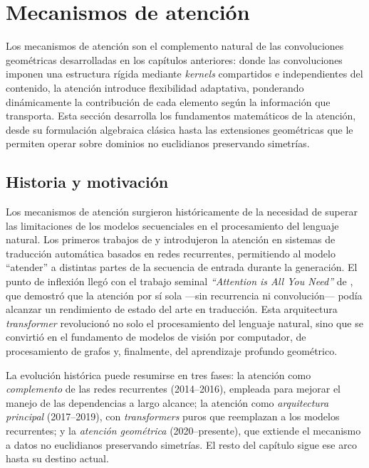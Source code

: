 \section{Mecanismos de atenci\'on}
\label{sec:apps:attention-foundations}

Los mecanismos de atenci\'on son el complemento natural de las convoluciones
geom\'etricas desarrolladas en los cap\'itulos anteriores: donde las
convoluciones imponen una estructura r\'igida mediante \emph{kernels}
compartidos e independientes del contenido, la atenci\'on introduce flexibilidad
adaptativa, ponderando din\'amicamente la contribuci\'on de cada elemento seg\'un
la informaci\'on que transporta. Esta secci\'on desarrolla los fundamentos
matem\'aticos de la atenci\'on, desde su formulaci\'on algebraica cl\'asica hasta
las extensiones geom\'etricas que le permiten operar sobre dominios no
euclidianos preservando simetr\'ias.

\subsection{Historia y motivaci\'on}
\label{subsec:apps:attn-history}

Los mecanismos de atenci\'on surgieron hist\'oricamente de la necesidad de
superar las limitaciones de los modelos secuenciales en el procesamiento del
lenguaje natural. Los primeros trabajos de \citet{bahdanau2014neural} y
\citet{luong2015effective} introdujeron la atenci\'on en sistemas de traducci\'on
autom\'atica basados en redes recurrentes, permitiendo al modelo ``atender'' a
distintas partes de la secuencia de entrada durante la generaci\'on. El punto de
inflexi\'on lleg\'o con el trabajo seminal \emph{``Attention is All You Need''}
de \citet{vaswani2017attentionneed}, que demostr\'o que la atenci\'on por s\'i
sola ---sin recurrencia ni convoluci\'on--- pod\'ia alcanzar un rendimiento de
estado del arte en traducci\'on. Esta arquitectura \emph{transformer}
revolucion\'o no solo el procesamiento del lenguaje natural, sino que se
convirti\'o en el fundamento de modelos de visi\'on por computador, de
procesamiento de grafos y, finalmente, del aprendizaje profundo geom\'etrico.

La evoluci\'on hist\'orica puede resumirse en tres fases: la atenci\'on como
\emph{complemento} de las redes recurrentes (2014--2016), empleada para mejorar
el manejo de las dependencias a largo alcance; la atenci\'on como
\emph{arquitectura principal} (2017--2019), con \emph{transformers} puros que
reemplazan a los modelos recurrentes; y la \emph{atenci\'on geom\'etrica}
(2020--presente), que extiende el mecanismo a datos no euclidianos preservando
simetr\'ias. El resto del cap\'itulo sigue ese arco hasta su destino actual.

